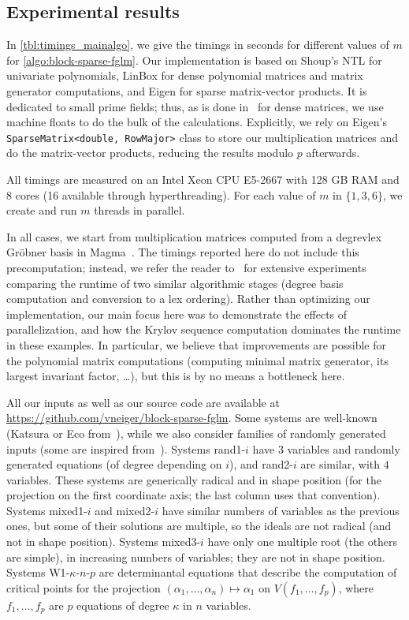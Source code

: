\documentclass[final,1p,times,authoryear]{elsarticle}
\begin{document}

\subsection{Experimental results}\label{section:ex}

In \cref{tbl:timings_mainalgo}, we give the timings in seconds for
different values of $m$ for \cref{algo:block-sparse-fglm}.  Our
implementation is based on Shoup's NTL for univariate polynomials, LinBox
for dense polynomial matrices and matrix generator
computations, and Eigen for sparse matrix-vector
products. It is dedicated to small prime fields; thus,
as is done in~\citep{fflas-ffpack} for dense matrices, we use machine
floats to do the bulk of the calculations. Explicitly, we rely on
Eigen's {\tt SparseMatrix<double, RowMajor>} class to store our
multiplication matrices and do the matrix-vector products, reducing
the results modulo $p$ afterwards.

All timings are measured on an Intel Xeon CPU E5-2667 with 128 GB RAM
and 8 cores (16 available through hyperthreading). For each value of
$m$ in $\{1,3,6\}$, we create and run $m$ threads in parallel.

In all cases, we start from multiplication matrices computed from a
{degrevlex} Gr\"obner basis in Magma~\citep{BoCaPl97}. The timings
reported here do not include this precomputation; instead, we refer
the reader to~\citep{FaMo17} for extensive experiments comparing the
runtime of two similar algorithmic stages (degree basis computation and
conversion to a lex ordering).  Rather than optimizing our
implementation, our main focus here was to demonstrate the effects of
parallelization, and how the Krylov sequence computation dominates the
runtime in these examples. In particular, we believe that
improvements are possible for the polynomial matrix computations
(computing minimal matrix generator, its largest invariant factor,
\dots), but this is by no means a bottleneck here.

All our inputs as well as our source code are available at
\url{https://github.com/vneiger/block-sparse-fglm}.
Some systems
are well-known (Katsura or Eco from~\citep{Morgan88}), while we also
consider families of randomly generated inputs (some are
inspired from~\citep{FaMo17}). Systems rand1-$i$ have $3$ variables and
randomly generated equations (of degree depending on $i$), and
rand2-$i$ are similar, with $4$ variables. These systems are
generically radical and in shape position (for the projection on the
first coordinate axis; the last column uses that
convention). Systems mixed1-$i$ and mixed2-$i$ have similar numbers of
variables as the previous ones, but some of their solutions are
multiple, so the ideals are not radical (and not in shape
position). Systems mixed3-$i$ have only one multiple root (the others
are simple), in increasing numbers of variables; they are not in shape
position. Systems W1-$\kappa$-$n$-$p$ are determinantal equations that
describe the computation of critical points for the projection $
(\alpha_1,\dots,\alpha_n) \mapsto \alpha_1$ on $V(f_1,\dots,f_p)$,
where $f_1,\dots,f_p$ are $p$ equations of degree $\kappa$ in $n$
variables.
\end{document}
